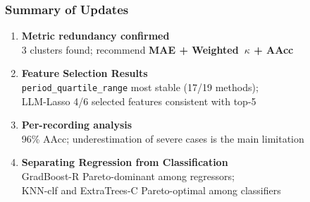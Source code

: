 \documentclass[aspectratio=169]{beamer}
\begin{document}
\begin{frame}
    \frametitle{Summary of Updates}
    \begin{enumerate}
        \item \textbf{Metric redundancy confirmed}\\
              3 clusters found; recommend \textbf{MAE + Weighted~$\kappa$ + AAcc}
        \vspace{0.3em}
        \item \textbf{Feature Selection Results}\\
              \texttt{period\_quartile\_range} most stable (17/19 methods);\\
              LLM-Lasso 4/6 selected features consistent with top-5
        \vspace{0.3em}
        \item \textbf{Per-recording analysis}\\
              96\% AAcc; underestimation of severe cases is the main limitation
        \vspace{0.3em}
        \item \textbf{Separating Regression from Classification}\\
              GradBoost-R Pareto-dominant among regressors;\\
              KNN-clf and ExtraTrees-C Pareto-optimal among classifiers
    \end{enumerate}
\end{frame}

\end{document}
